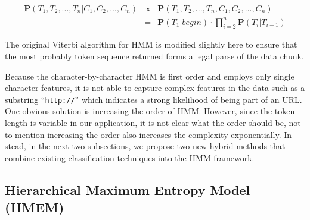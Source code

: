 \begin{eqnarray}
\mathbf{P}(T_1, T_2, ..., T_n|C_1, C_2, ..., C_n) & \propto & \mathbf{P}(T_1, T_2, ..., T_n, C_1, C_2, ..., C_n) \nonumber \\
& = & \mathbf{P}(T_1|begin) \cdot
\prod_{i=2}^{n}{\mathbf{P}(T_i|T_{i-1})}
\end{eqnarray}


The original Viterbi algorithm for HMM is modified slightly here 
to ensure that the most probably token sequence returned forms a legal
parse of the data chunk. 

Because the character-by-character HMM is first order and employs only 
single character features, it is not able to capture complex features
in the data such as  
a substring ``{\tt http://}'' which indicates a strong likelihood 
of being part of an URL.
One obvious solution is increasing the order of HMM. 
However, since the token length is variable in
our application, it is not clear what the order should be, not to mention
increasing the order also increases the complexity exponentially. 
In stead, in the next two subsections, we propose two new hybrid
methods that combine existing classification techniques into the
HMM framework.

\subsection{Hierarchical Maximum Entropy Model (HMEM)}\label{subsec:hmem}

